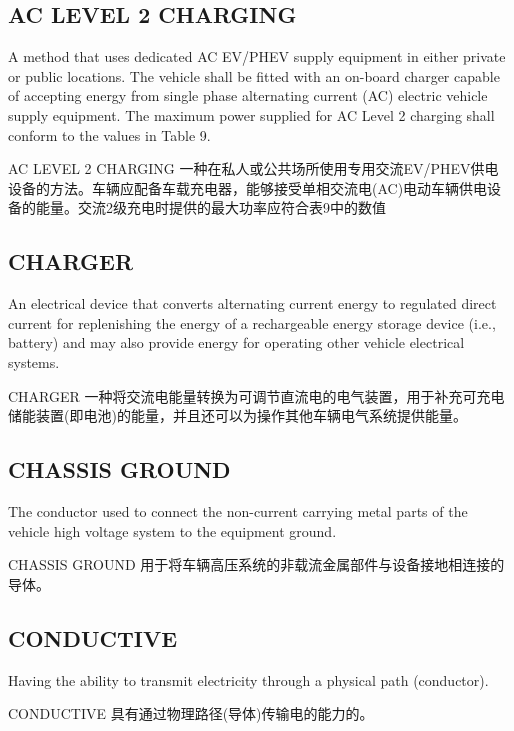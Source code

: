         
    \subsection*{AC LEVEL 2 CHARGING }
        \label{def2}
        A method that uses dedicated AC EV/PHEV supply equipment in either private or public locations. The vehicle shall be 
        fitted with an on-board charger capable of accepting energy from single phase alternating current (AC) electric vehicle 
        supply equipment. The maximum power supplied for AC Level 2 charging shall conform to the values in Table 9. 
            \begin{definition}{AC LEVEL 2 CHARGING}
                一种在私人或公共场所使用专用交流EV/PHEV供电设备的方法。车辆应配备车载充电器，能够接受单相交流电(AC)电动车辆供电设备的能量。交流2级充电时提供的最大功率应符合表9中的数值
            \end{definition}
    
    \subsection*{CHARGER }
        \label{def3}
        An electrical device that converts alternating current energy to regulated direct current for replenishing the energy of a 
        rechargeable energy storage device (i.e., battery) and may also provide energy for operating other vehicle electrical 
        systems.  
            \begin{definition}{CHARGER}
                一种将交流电能量转换为可调节直流电的电气装置，用于补充可充电储能装置(即电池)的能量，并且还可以为操作其他车辆电气系统提供能量。
            \end{definition}

   \subsection*{CHASSIS GROUND }
        \label{def4}
        The conductor used to connect the non-current carrying metal parts of the vehicle high voltage system to the equipment 
        ground. 
            \begin{definition}{CHASSIS GROUND}
                用于将车辆高压系统的非载流金属部件与设备接地相连接的导体。
            \end{definition}

    \subsection*{CONDUCTIVE }
        \label{def5}
        Having the ability to transmit electricity through a physical path (conductor). 
            \begin{definition}{CONDUCTIVE}
                具有通过物理路径(导体)传输电的能力的。
            \end{definition}

